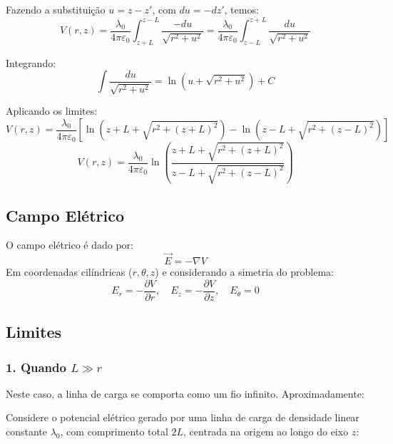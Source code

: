 \documentclass[a4paper,12pt]{article}
\begin{document}
Fazendo a substituição \( u = z - z' \), com \( du = -dz' \), temos:
\begin{equation}
V(r,z) = \frac{\lambda_0}{4\pi\varepsilon_0} \int_{z+L}^{z-L} \frac{-du}{\sqrt{r^2 + u^2}} = \frac{\lambda_0}{4\pi\varepsilon_0} \int_{z-L}^{z+L} \frac{du}{\sqrt{r^2 + u^2}}
\end{equation}

Integrando:
\begin{equation}
\int \frac{du}{\sqrt{r^2 + u^2}} = \ln\left(u + \sqrt{r^2 + u^2}\right) + C
\end{equation}

Aplicando os limites:
\begin{equation}
V(r,z) = \frac{\lambda_0}{4\pi\varepsilon_0} \left[ \ln\left(z+L + \sqrt{r^2 + (z+L)^2}\right) - \ln\left(z-L + \sqrt{r^2 + (z-L)^2}\right) \right]
\end{equation}
\begin{equation}
\boxed{
V(r,z) = \frac{\lambda_0}{4\pi\varepsilon_0} \ln\left( \frac{z+L + \sqrt{r^2 + (z+L)^2}}{z-L + \sqrt{r^2 + (z-L)^2}} \right)
}
\end{equation}

\subsection*{Campo Elétrico}

O campo elétrico é dado por:
\begin{equation}
\vec{E} = -\nabla V
\end{equation}
Em coordenadas cilíndricas (\( r, \theta, z \)) e considerando a simetria do problema:
\begin{equation}
E_r = -\frac{\partial V}{\partial r}, \quad E_z = -\frac{\partial V}{\partial z}, \quad E_\theta = 0
\end{equation}

\subsection*{Limites}

\subsubsection*{1. Quando \( L \gg r \)}

Neste caso, a linha de carga se comporta como um fio infinito. Aproximadamente:

Considere o potencial elétrico gerado por uma linha de carga de densidade linear constante $\lambda_0$, com comprimento total $2L$, centrada na origem ao longo do eixo $z$:
\end{document}

